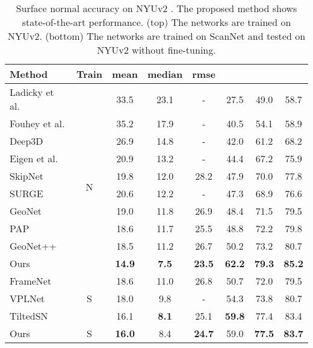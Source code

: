 \documentclass[10pt,twocolumn,letterpaper]{article}
\begin{document}
\begin{table}[t]
\small
\setlength\tabcolsep{1.5pt}
\begin{center}
\begin{tabular}{l|c|ccc|ccc}
\toprule
Method & Train & mean & median & rmse &  &  &  \\
\midrule
Ladicky et al. \cite{SNfromRGB_14_Ladicky} & \multirow{11}{*}{N} & 33.5 & 23.1 & - & 27.5 & 49.0 & 58.7 \\
Fouhey et al. \cite{SNfromRGB_14_Fouhey} & & 35.2 & 17.9 & - & 40.5 & 54.1 & 58.9 \\
Deep3D \cite{SNfromRGB_15_Deep3D} & & 26.9 & 14.8 & - & 42.0 & 61.2 & 68.2 \\
Eigen et al. \cite{SNfromRGB_15_Eigen} & & 20.9 & 13.2 & - & 44.4 & 67.2 & 75.9 \\
SkipNet \cite{SNfromRGB_16_SkipNet} & & 19.8 & 12.0 & 28.2 & 47.9 & 70.0 & 77.8 \\
SURGE \cite{SNfromRGB_16_SURGE} & & 20.6 & 12.2 & - & 47.3 & 68.9 & 76.6 \\
GeoNet \cite{SNfromRGB_18_GeoNet} & & 19.0 & 11.8 & 26.9 & 48.4 & 71.5 & 79.5 \\
PAP \cite{SNfromRGB_19_PAP} & & 18.6 & 11.7 & 25.5 & 48.8 & 72.2 & 79.8 \\
GeoNet++ \cite{SNfromRGB_20_GeoNet++} & & 18.5 & 11.2 & 26.7 & 50.2 & 73.2 & 80.7 \\
\hline
Ours & N & \textbf{14.9} & \textbf{7.5} & \textbf{23.5} & \textbf{62.2} & \textbf{79.3} & \textbf{85.2} \\
\hline
\hline
FrameNet\cite{SNfromRGB_19_FrameNet} & & 18.6 & 11.0 & 26.8 & 50.7 & 72.0 & 79.5 \\
VPLNet\cite{SNfromRGB_20_VPLNet} & S & 18.0 & 9.8 & - & 54.3 & 73.8 & 80.7 \\
TiltedSN\cite{SNfromRGB_20_TiltedSN} & & 16.1 & \textbf{8.1} & 25.1 & \textbf{59.8} & 77.4 & 83.4 \\
\hline
Ours & S & \textbf{16.0} & 8.4 & \textbf{24.7} & 59.0 & \textbf{77.5} & \textbf{83.7} \\
\bottomrule
\end{tabular}
\end{center}
\caption{Surface normal accuracy on NYUv2 \cite{NYUv2}. The proposed method shows state-of-the-art performance. (top) The networks are trained on NYUv2. (bottom) The networks are trained on ScanNet \cite{ScanNet} and tested on NYUv2 without fine-tuning.}
\label{table:BM-nyu}
\end{table}
\end{document}
